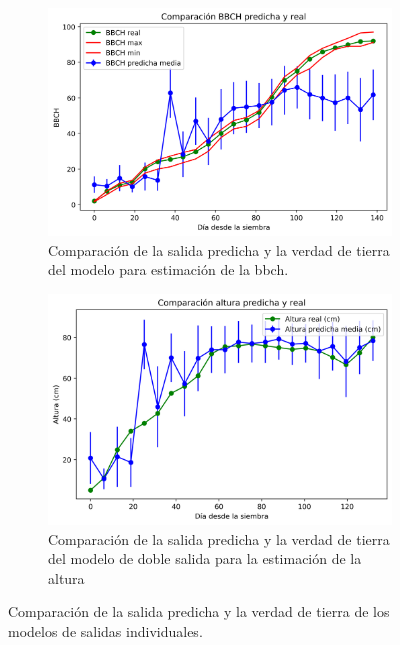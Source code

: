 \begin{figure}[H]
\centering
\begin{subfigure}{.85\textwidth}
  \centering
  \includegraphics[width=0.95\linewidth]{archivos/tfg/Pixel/BBCH_COMPARACION_BIEN}
  \caption{Comparación de la salida predicha y la verdad de tierra del modelo para estimación de la \gls{bbch}. \label{fig:p_comp_b}}
\end{subfigure}
\begin{subfigure}{.85\textwidth}
  \centering
  \includegraphics[width=0.95\linewidth]{archivos/tfg/Pixel/H_COMPARACION_BIEN}
  \caption{Comparación de la salida predicha y la verdad de tierra del modelo de doble salida para la estimación de la altura\label{fig:p_comp_h}}
\end{subfigure}
\caption{Comparación de la salida predicha y la verdad de tierra de los modelos de salidas individuales. \label{fig:p_comp}}
\end{figure}

